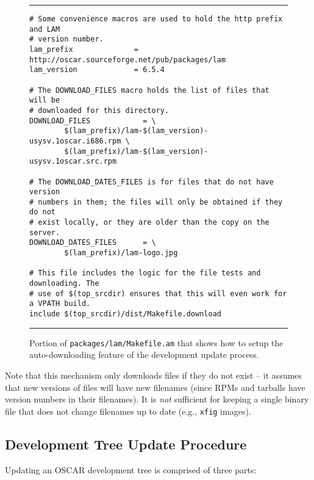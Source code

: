 \begin{figure}[tbp]
  \begin{center}
\hrule
\vspace{5pt}
\begin{verbatim}
# Some convenience macros are used to hold the http prefix and LAM
# version number.
lam_prefix              = http://oscar.sourceforge.net/pub/packages/lam
lam_version             = 6.5.4

# The DOWNLOAD_FILES macro holds the list of files that will be
# downloaded for this directory.
DOWNLOAD_FILES            = \
        $(lam_prefix)/lam-$(lam_version)-usysv.1oscar.i686.rpm \
        $(lam_prefix)/lam-$(lam_version)-usysv.1oscar.src.rpm

# The DOWNLOAD_DATES_FILES is for files that do not have version
# numbers in them; the files will only be obtained if they do not
# exist locally, or they are older than the copy on the server.
DOWNLOAD_DATES_FILES      = \
        $(lam_prefix)/lam-logo.jpg

# This file includes the logic for the file tests and downloading. The
# use of $(top_srcdir) ensures that this will even work for a VPATH build.
include $(top_srcdir)/dist/Makefile.download
\end{verbatim}
\vspace{5pt}
\hrule
    \caption{Portion of {\tt packages/lam/Makefile.am} that shows how to setup the auto-downloading feature of the development update process.}
    \label{fig:makefile-bin-download}
  \end{center}
\end{figure}

Note that this mechanism only downloads files if they do not exist --
it assumes that new versions of files will have new filenames (since
RPMs and tarballs have version numbers in their filenames).  It is
{\em not} sufficient for keeping a single binary file that does not
change filenames up to date (e.g., {\tt xfig} images).


\subsection{Development Tree Update Procedure}

Updating an OSCAR development tree is comprised of three parts:

